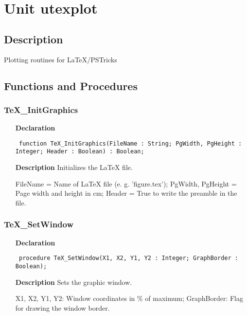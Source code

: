 \documentclass[12pt,a4paper,oneside]{report}
\newcommand{\declarationitem}[1]{\textbf{#1}}
\newcommand{\descriptiontitle}[1]{\textbf{#1}}
\newcommand{\code}[1]{\texttt{#1}}
\begin{document}
\section{Unit utexplot}
\label{utexplot}
\subsection{Description}
Plotting routines for LaTeX/PSTricks
\subsection{Functions and Procedures}
\subsubsection{TeX{\_}InitGraphics}
\label{utexplot-TeX_InitGraphics}
\begin{itemize}\item[\declarationitem{Declaration}\hfill]
	\begin{flushleft}
		\code{
			function TeX{\_}InitGraphics(FileName : String; PgWidth, PgHeight : Integer; Header : Boolean) : Boolean;}
		
	\end{flushleft}
	
	\par
	\item[\descriptiontitle{Description}]
	Initializes the LaTeX file.
	
	FileName = Name of LaTeX file (e. g. 'figure.tex'); PgWidth, PgHeight = Page width and height in cm; Header = True to write the preamble in the file.
	
\end{itemize}
\subsubsection{TeX{\_}SetWindow}
\label{utexplot-TeX_SetWindow}
\begin{itemize}\item[\declarationitem{Declaration}\hfill]
	\begin{flushleft}
		\code{
			procedure TeX{\_}SetWindow(X1, X2, Y1, Y2 : Integer; GraphBorder : Boolean);}
		
	\end{flushleft}
	
	\par
	\item[\descriptiontitle{Description}]
	Sets the graphic window.
	
	X1, X2, Y1, Y2: Window coordinates in {\%} of maximum; GraphBorder: Flag for drawing the window border.
	
\end{itemize}
\end{document}
